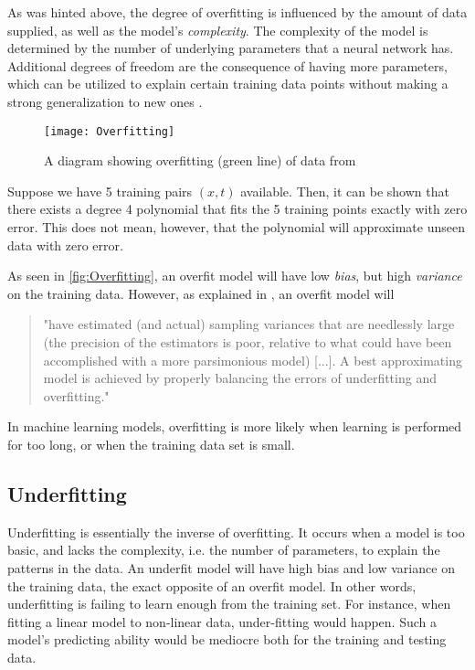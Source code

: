 \documentclass{article}
\begin{document}
As was hinted above, the degree of overfitting is influenced by the amount of data supplied, as well as the model's \textit{complexity}. The complexity of the model is determined by the number of underlying parameters that a neural network has. Additional degrees of freedom are the consequence of having more parameters, which can be utilized to explain certain training data points without making a strong generalization to new ones \citep{inbook:Aggarwal-4.1}.
\begin{wrapfigure}{R}{0.4\textwidth} %
    \centering
    \texttt{[image: Overfitting]}
    \caption{A diagram showing overfitting (green line) of data from \citep{overfitting-img}}
    \label{fig:Overfitting}
\end{wrapfigure}
\begin{example}
  Suppose we have 5 training pairs $(x, t)$ available. Then, it can be shown that there exists a degree 4 polynomial that fits the 5 training points exactly with zero error. This does not mean, however, that the polynomial will approximate unseen data with zero error. 
\end{example}
As seen in \autoref{fig:Overfitting}, an overfit model will have low \textit{bias}, but high \textit{variance} on the training data. However, as explained in \cite{burnham2002model}, an overfit model will
\begin{quote}"have estimated (and actual) sampling variances that are needlessly large (the precision of the estimators is poor, relative to what could have been accomplished with a more parsimonious model) [...]. A best approximating model is achieved by properly balancing the errors of underfitting and overfitting." \end{quote}
\begin{remark} 
  In machine learning models, overfitting is more likely when learning is performed for too long, or when the training data set is small.
\end{remark}
\subsection{Underfitting}%
  \label{sub:Underfitting}
  Underfitting is essentially the inverse of overfitting. It occurs when a model is too basic, and lacks the complexity, i.e. the number of parameters, to explain the patterns in the data. An underfit model will have high bias and low variance on the training data, the exact opposite of an overfit model. In other words, underfitting is failing to learn enough from the training set. For instance, when fitting a linear model to non-linear data, under-fitting would happen. Such a model's predicting ability would be mediocre both for the training and testing data.
\end{document}
